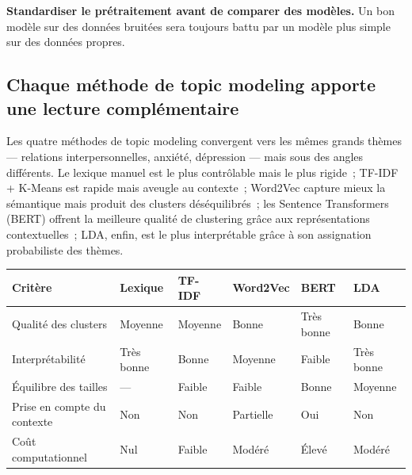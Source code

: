 \documentclass[12pt,a4paper]{report}
\renewcommand{\arraystretch}{1}
\begin{document}
\begin{note}
\textbf{Standardiser le prétraitement avant de comparer des modèles.} Un bon modèle sur des
données bruitées sera toujours battu par un modèle plus simple sur des données propres.
\end{note}

\subsection{Chaque méthode de topic modeling apporte une lecture complémentaire}

Les quatre méthodes de topic modeling convergent vers les mêmes grands thèmes --- relations
interpersonnelles, anxiété, dépression --- mais sous des angles différents. Le lexique
manuel est le plus contrôlable mais le plus rigide~; TF-IDF + K-Means est rapide mais
aveugle au contexte~; Word2Vec capture mieux la sémantique mais produit des clusters
déséquilibrés~; les Sentence Transformers (BERT) offrent la meilleure qualité de clustering
grâce aux représentations contextuelles~; LDA, enfin, est le plus interprétable grâce à
son assignation probabiliste des thèmes.

\begin{center}
\renewcommand{\arraystretch}{1.3}
\begin{tabularx}{\textwidth}{@{}>{\raggedright\arraybackslash}p{3cm}
                               >{\centering\arraybackslash}p{1.8cm}
                               >{\centering\arraybackslash}p{1.8cm}
                               >{\centering\arraybackslash}p{1.8cm}
                               >{\centering\arraybackslash}p{1.8cm}
                               >{\centering\arraybackslash}p{2.2cm}@{}}
\toprule
\textbf{Critère} & \textbf{Lexique} & \textbf{TF-IDF} & \textbf{Word2Vec} & \textbf{BERT} & \textbf{LDA} \\
\midrule
Qualité des clusters      & Moyenne   & Moyenne   & Bonne     & Très bonne & Bonne \\
Interprétabilité          & Très bonne & Bonne    & Moyenne   & Faible     & Très bonne \\
Équilibre des tailles     & ---       & Faible    & Faible    & Bonne      & Moyenne \\
Prise en compte du contexte & Non    & Non       & Partielle & Oui        & Non \\
Coût computationnel       & Nul       & Faible    & Modéré    & Élevé      & Modéré \\
\bottomrule
\end{tabularx}
\end{center}
\end{document}
